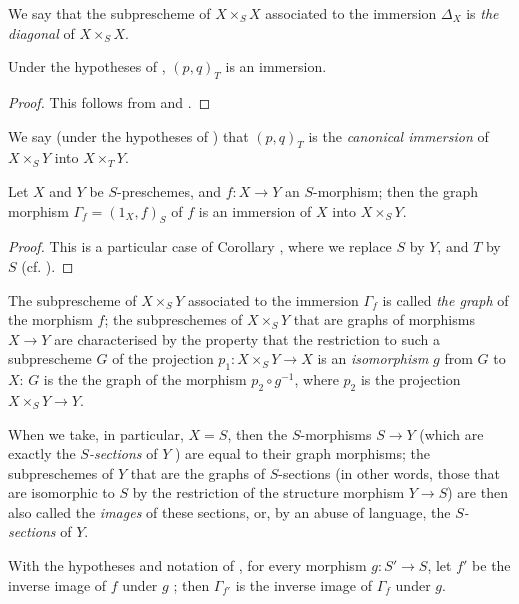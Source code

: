 We say that the subprescheme of $X\times_S X$ associated to the immersion $\Delta_X$  is \emph{the diagonal} of $X\times_S X$.

\begin{cor}[5.3.10]
\label{1.5.3.10}
Under the hypotheses of , $(p,q)_T$ is an immersion.
\end{cor}

\begin{proof}
\label{proof-1.5.3.10}
This follows from  and .
\end{proof}

We say (under the hypotheses of ) that $(p,q)_T$ is the \emph{canonical immersion} of $X\times_S Y$ into $X\times_T Y$.

\begin{cor}[5.3.11]
\label{1.5.3.11}
Let $X$ and $Y$ be $S$-preschemes, and $f:X\to Y$ an $S$-morphism;
then the graph morphism $\Gamma_f=(1_X,f)_S$ of $f$  is an immersion of $X$ into $X\times_S Y$.
\end{cor}

\begin{proof}
\label{proof-1.5.3.11}
This is a particular case of Corollary , where we replace $S$ by $Y$, and $T$ by $S$ (cf. ).
\end{proof}

The subprescheme of $X\times_S Y$ associated to the immersion $\Gamma_f$  is called \emph{the graph} of the morphism $f$;
the subpreschemes of $X\times_S Y$ that are graphs of morphisms $X\to Y$ are characterised by the property that the restriction to such a subprescheme $G$ of the projection $p_1:X\times_S Y\to X$ is an \emph{isomorphism} $g$ from $G$ to $X$:
$G$ is the the graph of the morphism $p_2\circ g^{-1}$, where $p_2$ is the projection $X\times_S Y\to Y$.

When we take, in particular, $X=S$, then the $S$-morphisms $S\to Y$ (which are exactly the \emph{$S$-sections} of $Y$ ) are equal to their graph morphisms;
the subpreschemes of $Y$ that are the graphs of $S$-sections (in other words, those that are isomorphic to $S$ by the restriction of the structure morphism $Y\to S$) are then also called the \emph{images} of these sections, or, by an abuse of language, the \emph{$S$-sections} of $Y$.

\begin{cor}[5.3.12]
\label{1.5.3.12}
With the hypotheses and notation of , for every morphism $g:S'\to S$, let $f'$ be the inverse image of $f$ under $g$ ;
then $\Gamma_{f'}$ is the inverse image of $\Gamma_f$ under $g$.
\end{cor}

